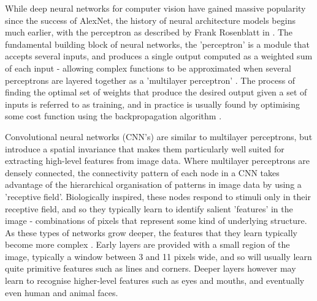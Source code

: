 \documentclass[openany]{book}
\begin{document}
While deep neural networks for computer vision have gained massive popularity since the success of AlexNet, the history of neural architecture models begins much earlier, with the perceptron as described by Frank Rosenblatt in \cite{rosenblatt1959neurodynamics}. The fundamental building block of neural networks, the 'perceptron' is a module that accepts several inputs, and produces a single output computed as a weighted sum of each input - allowing complex functions to be approximated when several perceptrons are layered together as a 'multilayer perceptron' \cite{minsky1969perceptrons}. The process of finding the optimal set of weights that produce the desired output given a set of inputs is referred to as training, and in practice is usually found by optimising some cost function using the backpropagation algorithm \cite{rumelhart1986backprop}. 

Convolutional neural networks (CNN's) are similar to multilayer perceptrons, but introduce a spatial invariance that makes them particularly well suited for extracting high-level features from image data. Where multilayer perceptrons are densely connected, the connectivity pattern of each node in a CNN takes advantage of the hierarchical organisation of patterns in image data by using a 'receptive field'. Biologically inspired, these nodes respond to stimuli only in their receptive field, and so they typically learn to identify salient 'features' in the image - combinations of pixels that represent some kind of underlying structure. As these types of networks grow deeper, the features that they learn typically become more complex \cite{lecun1989cnn}. Early layers are provided with a small region of the image, typically a window between 3 and 11 pixels wide, and so will usually learn quite primitive features such as lines and corners. Deeper layers however may learn to recognise higher-level features such as eyes and mouths, and eventually even human and animal faces.
\end{document}
